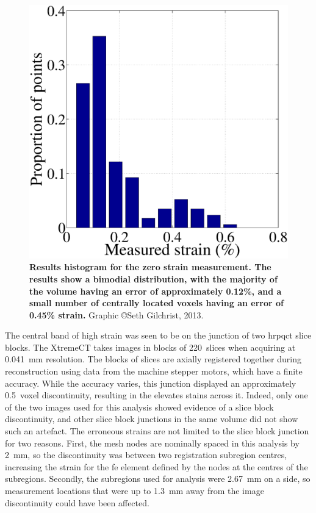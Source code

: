 \begin{figure}
\centering
\includegraphics[width=0.7\linewidth]{./appendixDvc/figures/ZeroStrainHist}
\caption[Zero strain histogram]{\textbf{Results histogram for the zero strain measurement. The results show a bimodial distribution, with the majority of the volume having an error of approximately 0.12\%, and a small number of centrally located voxels having an error of 0.45\% strain.} Graphic \copyright Seth Gilchrist, 2013.}
\label{fig:ZeroStrainHist}
\end{figure}

The central band of high strain was seen to be on the junction of two \ac{hrpqct} slice blocks.
The XtremeCT takes images in blocks of 220~slices when acquiring at 0.041~\ac{mm} resolution.
The blocks of slices are axially registered together during reconstruction using data from the machine stepper motors, which have a finite accuracy.
While the accuracy varies, this junction displayed an approximately 0.5~voxel discontinuity, resulting in the elevates stains across it.
Indeed, only one of the two images used for this analysis showed evidence of a slice block discontinuity, and other slice block junctions in the same volume did not show such an artefact.
The erroneous strains are not limited to the slice block junction for two reasons.
First, the mesh nodes are nominally spaced in this analysis by 2~\ac{mm}, so the discontinuity was between two registration subregion centres, increasing the strain for the \ac{fe} element defined by the nodes at the centres of the subregions.
Secondly, the subregions used for analysis were 2.67~\ac{mm} on a side, so measurement locations that were up to 1.3~\ac{mm} away from the image discontinuity could have been affected.

